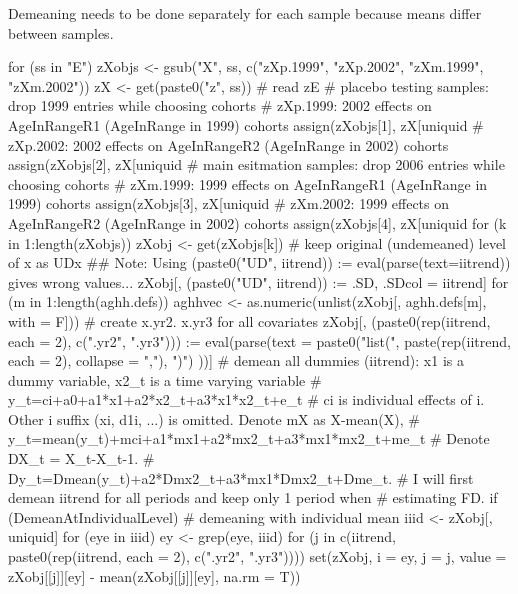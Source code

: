 Demeaning needs to be done separately for each sample because means differ between samples. 
\begin{Schunk}
\begin{Sinput}
for (ss in "E") {
  zXobjs <- gsub("X", ss, c("zXp.1999", "zXp.2002", "zXm.1999", "zXm.2002"))
  zX <- get(paste0("z", ss))
  # read zE
  # placebo testing samples: drop 1999 entries while choosing cohorts
  #   zXp.1999: 2002 effects on AgeInRangeR1 (AgeInRange in 1999) cohorts
  assign(zXobjs[1], 
    zX[uniquid %in% uniquid[AgeInRangeR1 == 1] & survey != 1999, ])
  #   zXp.2002: 2002 effects on AgeInRangeR2 (AgeInRange in 2002) cohorts
  assign(zXobjs[2], 
    zX[uniquid %in% uniquid[AgeInRangeR2 == 1] & survey != 1999, ])
  # main esitmation samples: drop 2006 entries while choosing cohorts
  #   zXm.1999: 1999 effects on AgeInRangeR1 (AgeInRange in 1999) cohorts
  assign(zXobjs[3], 
    zX[uniquid %in% uniquid[AgeInRangeR1 == 1] & survey != 2006, ])
  #   zXm.2002: 1999 effects on AgeInRangeR2 (AgeInRange in 2002) cohorts
  assign(zXobjs[4], 
    zX[uniquid %in% uniquid[AgeInRangeR2 == 1] & survey != 2006, ])
  for (k in 1:length(zXobjs)) {
    zXobj <- get(zXobjs[k])
    # keep original (undemeaned) level of x as UDx
    ## Note: Using (paste0("UD", iitrend)) := eval(parse(text=iitrend)) gives wrong values...
    zXobj[, (paste0("UD", iitrend)) := .SD, .SDcol = iitrend]
    for (m in 1:length(aghh.defs))
    {
      aghhvec <- as.numeric(unlist(zXobj[, aghh.defs[m], with = F]))
      # create x.yr2. x.yr3 for all covariates
      zXobj[, (paste0(rep(iitrend, each = 2), c(".yr2", ".yr3"))) := 
        eval(parse(text = 
          paste0("list(", paste(rep(iitrend, each = 2), collapse = ","), ")")
        ))]
      # demean all dummies (iitrend): x1 is a dummy variable, x2_{t} is a time varying variable
      #   y_{t}=ci+a0+a1*x1+a2*x2_{t}+a3*x1*x2_{t}+e_{t}
      # ci is individual effects of i. Other i suffix (xi, d1i, ...) is omitted. Denote mX as X-mean(X),
      #   y_{t}=mean(y_{t})+mci+a1*mx1+a2*mx2_{t}+a3*mx1*mx2_{t}+me_{t}
      # Denote DX_{t} = X_{t}-X_{t-1}.
      #   Dy_{t}=Dmean(y_{t})+a2*Dmx2_{t}+a3*mx1*Dmx2_{t}+Dme_{t}.
      # I will first demean iitrend for all periods and keep only 1 period when 
      # estimating FD.
      if (DemeanAtIndividualLevel){
        # demeaning with individual mean
         iiid <- zXobj[, uniquid]
         for (eye in iiid) {
           ey <- grep(eye, iiid)
           for (j in c(iitrend, paste0(rep(iitrend, each = 2), c(".yr2", ".yr3"))))
             set(zXobj, i = ey, j = j, value = zXobj[[j]][ey] - mean(zXobj[[j]][ey], na.rm = T))
}}}}}
\end{Sinput}
\end{Schunk}
